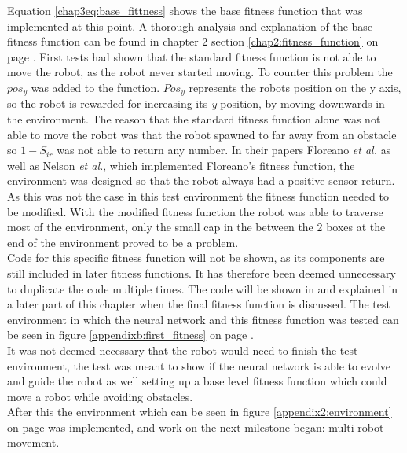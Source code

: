 Equation \ref{chap3eq:base_fittness} shows the base fitness function that was implemented at this point. 
A thorough analysis and explanation of the base fitness function can be found in chapter 2 section \ref{chap2:fitness_function} on page \pageref{chap2:fitness_function}. 
First tests had shown that the standard fitness function is not able to move the robot, as the robot never started moving. To counter this problem the $pos_y$ was added to the function. $Pos_y$ represents the robots position on the y axis, so the robot is rewarded for increasing its \textit{y} position, by moving downwards in the environment.
The reason that the standard fitness function alone was not able to move the robot was that the robot spawned to far away from an obstacle so $1 - S_{ir}$ was not able to return any number. In their papers Floreano \textit{et al.}\cite{499791} as well as Nelson \textit{et al.}\cite{Nelson2009Fitness}, which implemented Floreano's fitness function, the environment was designed so that the robot always had a positive sensor return. As this was not the case in this test environment the fitness function needed to be modified. 
With the modified fitness function the robot was able to traverse most of the environment, only the small cap in the between the 2 boxes at the end of the environment proved to be a problem.\\

Code for this specific fitness function will not be shown, as its components are still included in later fitness functions. It has therefore been deemed unnecessary to duplicate the code multiple times. 
The code will be shown in and explained in a later part of this chapter when the final fitness function is discussed. 
The test environment in which the neural network and this fitness function was tested can be seen in figure \ref{appendixb:first_fitness} on page \pageref{appendixb:first_fitness}. \\

It was not deemed necessary that the robot would need to finish the test environment, the test was meant to show if the neural network is able to evolve and guide the robot as well setting up a base level fitness function which could move a robot while avoiding obstacles. \\

After this the environment which can be seen in figure \ref{appendix2:environment} on page \pageref{appendix2:environment} was implemented, and work on the next milestone began: multi-robot movement.\\

